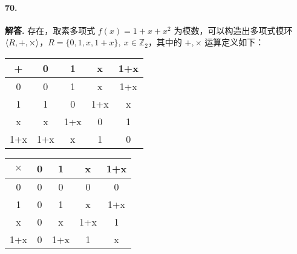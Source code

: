 \documentclass[12pt, a4paper, oneside]{ctexart}
\newenvironment{solution}{\par\noindent\textbf{解答. }}{\bigskip\par}
\begin{document}
\paragraph{70.}\begin{solution}
    存在，取素多项式 $f(x)=1+x+x^2$ 为模数，可以构造出多项式模环 $\braket{R,+,\times}$，$R=\{0,1,x,1+x\},\ x\in\mathbb{Z}_{2}$，其中的 $+,\times$ 运算定义如下：
    \begin{center}
    \begin{tabular}{|c|c|c|c|c|}
    \hline
    +   & 0   & 1   & x   & 1+x \\ \hline
    0   & 0   & 1   & x   & 1+x \\ \hline
    1   & 1   & 0   & 1+x & x   \\ \hline
    x   & x   & 1+x & 0   & 1   \\ \hline
    1+x & 1+x & x   & 1   & 0   \\ \hline
    \end{tabular}
    \quad\quad
    \begin{tabular}{|c|c|c|c|c|}
    \hline
    $\times$   & 0 & 1   & x   & 1+x \\ \hline
    0   & 0 & 0   & 0   & 0   \\ \hline
    1   & 0 & 1   & x   & 1+x \\ \hline
    x   & 0 & x   & 1+x & 1   \\ \hline
    1+x & 0 & 1+x & 1   & x   \\ \hline
    \end{tabular}
    \end{center}

\end{solution}
\end{document}
